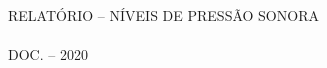\

\

\

\

\

\

\

\

\

\

\

\

\

\

\

\

\

\begin{center}
	RELATÓRIO – NÍVEIS DE PRESSÃO SONORA \\
	\nomeEmpresa \\
	DOC. \numeroRelatorio – 2020 \\
\end{center}